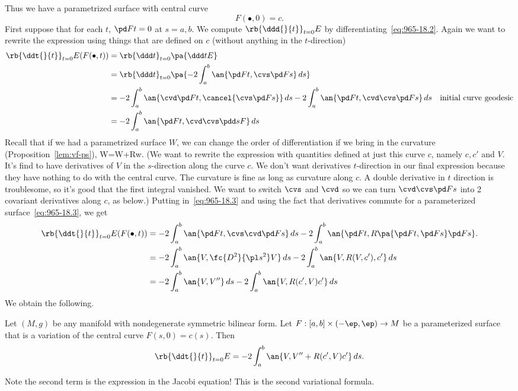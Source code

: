Thus we have a parametrized surface with central curve 
\[
F(\bullet, 0)=c.
\]
First suppose that for each $t$, $\pd Ft=0$ at $s=a,b$. 
We compute $\rb{\ddd{}{t}}_{t=0}E$ by differentiating~\eqref{eq:965-18.2}. Again we want to rewrite the expression using things that are defined on $c$ (without anything in the $t$-direction)
\begin{align*}
\rb{\ddt{}{t}}_{t=0} E(F(\bullet, t))
&=\rb{\ddd t}_{t=0} \pa{\ddd t E}\\
&=\rb{\ddd t}_{t=0} \pa{-2\int_a^b \an{\pd Ft, \cvs \pd Fs}\,ds}\\
&=-2\int_a^b \an{\cvd \pd Ft, \cancel{\cvs \pd Fs}}\, ds - 2\int_a^b \an{\pd Ft,\cvd \cvs \pd Fs}\,ds&\text{initial curve geodesic}\\
&=-2\int_a^b \an{\pd Ft, \cvd \cvs \pdd s F}\,ds
\end{align*}
Recall that if we had a parametrized surface $W$, we can change the order of differentiation if we bring in the curvature (Proposition~\ref{lem:vf-ps}),
\cvd\cvs W=\cvs \cvd W+Rw.
\eeq
(We want to rewrite the expression with quantities defined at just this curve $c$, namely $c,c'$ and $V$. It's find to have derivatives of $V$ in the $s$-direction along the curve $c$. We don't want derivatives $t$-direction in our final expression because they have nothing to do with the central curve. The curvature is fine as long as curvature along $c$. A double derivative in $t$ direction is troublesome, so it's good that the first integral vanished. We want to switch $\cvs$ and $\cvd$ so we can turn $\cvd\cvs \pd Fs$ into 2 covariant derivatives along $c$, as below.)
Putting in~\eqref{eq:965-18.3} and using the fact that derivatives commute for a parameterized surface~\eqref{eq:965-18.3}, we get
\begin{align}
\nonumber
\rb{\ddt{}{t}}_{t=0} E(F(\bullet, t))
&= -2\int_a^b \an{\pd Ft,\cvs \cvd \pd Fs}\,ds 
-2\int_a^b \an{\pd Ft, R\pa{\pd Ft, \pd Fs}\pd Fs}.\\
\nonumber
&=-2\int_a^b \an{V,\fc{D^2}{\pl s^2}V} \, ds
-2\int_a^b \an{V,R(V,c'),c'}\,ds\\
\nonumber
&=-2\int_a^b \an{V,V''}\,ds - 2\int_a^b \an{V, R(c',V)c'}\,ds
\end{align}
We obtain the following. 
\begin{pr}
Let $(M,g)$ be any manifold with nondegenerate symmetric bilinear form. Let $F:[a,b]\times (-\ep,\ep)\to M$ be a parameterized surface that is a variation of the central curve $F(s,0)=c(s)$. Then
\[
\rb{\ddt{}{t}}_{t=0} E%
=-2\int_a^b \an{V, V''+R(c',V)c'}\,ds.
\]
\end{pr}
Note the second term is the expression in the Jacobi equation! This is the second variational formula. 

